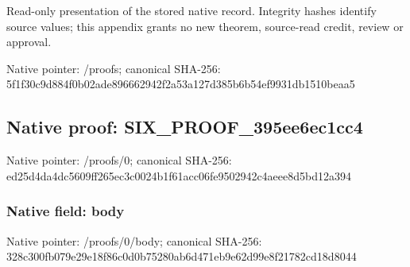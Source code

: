 \documentclass[10pt,a4paper]{article}
\begin{document}
Read-only presentation of the stored native record. Integrity hashes identify source values; this appendix grants no new theorem, source-read credit, review or approval.



Native pointer: /proofs; canonical SHA-256: 5f1f30c9d884f0b02ade8966\allowbreak{}62942f2a53a127d385b6b54e\allowbreak{}f9931db1510beaa5



\subsection{Native proof: SIX\_PROOF\_395ee6ec1cc4}


Native pointer: /proofs/0; canonical SHA-256: ed25d4da4dc5609ff265ec3c\allowbreak{}0024b1f61acc06fe9502942c\allowbreak{}4aeee8d5bd12a394



\subsubsection{Native field: body}


Native pointer: /proofs/0/body; canonical SHA-256: 328c300fb079e29e18f86c0d\allowbreak{}0b75280ab6d471eb9e62d99e\allowbreak{}8f21782cd18d8044
\end{document}
